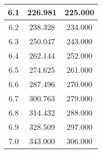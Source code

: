 \begin{table}[h!]
\begin{tabular}{|c|c|c|}
        6.1        & 226.981        & 225.000              \\ \hline
        6.2        & 238.328        & 234.000              \\ \hline
        6.3        & 250.047        & 243.000              \\ \hline
        6.4        & 262.144        & 252.000              \\ \hline
        6.5        & 274.625        & 261.000              \\ \hline
        6.6        & 287.496        & 270.000              \\ \hline
        6.7        & 300.763        & 279.000              \\ \hline
        6.8        & 314.432        & 288.000              \\ \hline
        6.9        & 328.509        & 297.000              \\ \hline
        7.0        & 343.000        & 306.000              \\ \hline
    \end{tabular}\label{tab:table4}
\end{table}
